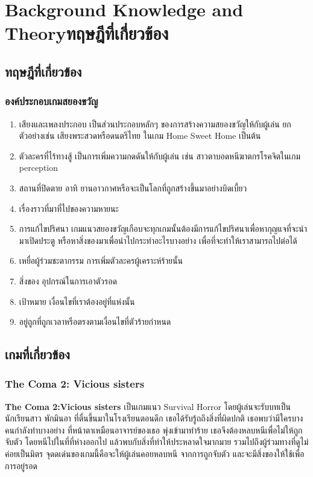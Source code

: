\chapter{\ifenglish Background Knowledge and Theory\else ทฤษฎีที่เกี่ยวข้อง\fi}


\section{ทฤษฎีที่เกี่ยวข้อง}
\subsection{องค์ประกอบเกมสยองขวัญ}
\begin{enumerate}
  \item เสียงและเพลงประกอบ เป็นส่วนประกอบหลักๆ ของการสร้างความสยองขวัญให้กับผู้เล่น ยกตัวอย่างเช่น เสียงพระสวดหรือดนตรีไทย ในเกม Home Sweet Home เป็นต้น
  \item ตัวละครที่ไร้ทางสู้ เป็นการเพิ่มความกดดันให้กับผู้เล่น เช่น สาวตาบอดหนีฆาตกรโรคจิตในเกม perception
  \item สถานที่ปิดตาย อาทิ ยานอาวกาศหรือจะเป็นโลกที่ถูกสร้างขึ้นมาอย่างบิดเบี้ยว
  \item เรื่องราวที่มาที่ไปของความหายนะ
  \item การแก้ไขปริศนา เกมแนวสยองขวัญเกือบจะทุกเกมนั้นต้องมีการแก้ไขปริศนาเพื่อหากุญแจที่จะนำมาเปิดประตู หรือหาสิ่งของมาเพื่อนำไปกระทำอะไรบางอย่าง เพื่อที่จะทำให้เราสามารถไปต่อได้
  \item เหยื่อผู้ร่วมชะตากรรม การเพิ่มตัวละครผู้เคราะห์ร้ายนั้น
  \item สิ่งของ อุปกรณ์ในการเอาตัวรอด
  \item เป้าหมาย เงื่อนไขที่เราต้องอยู่ที่แห่งนั้น
  \item อยู่ถูกที่ถูกเวลาหรือตรงตามเงื่อนไขที่ตัวร้ายกำหนด
\end{enumerate}

\section{เกมที่เกี่ยวข้อง}
\subsection{The Coma 2: Vicious sisters }
\subsubitem \textbf{The Coma 2:Vicious sisters} เป็นเกมแนว Survival Horror โดยผู้เล่นจะรับบทเป็นนักเรียนสาว พักมินอา ที่ตื่นขึ้นมาในโรงเรียนตอนดึก เธอได้รับรู้ถถึงสิ่งที่ผิดปกติ เธอพบว่ามีใครบางคนกำลังทำบางอย่าง ที่หน้าตาเหมือนอาจารย์ของเธอ พุ่งเข้ามาทำร้าย เธอจึงต้องหลบหนีเพื่อไม่ให้ถูกจับตัว โดยหนีไปในที่ที่ห่างออกไป แล้วพบกับสิ่งที่ทำให้ประหลาดใจมากมาย รวมไปถึงผู้ร่วมทางที่ดูไม่ค่อยเป็นมิตร จุดดเด่นของเกมนี้คือจะให้ผู้เล่นคอยหลบหนี จากการถูกจับตัว และจะมีสิ่งของให้ใช้เพื่อการอยู่รอด

